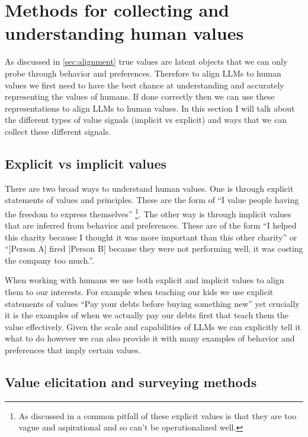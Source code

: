 \section{Methods for collecting and understanding human values}
\label{sec:values}

As discussed in \ref{sec:alignment} true values are latent objects that we can only probe through behavior and preferences. Therefore to align LLMs to human values we first need to have the best chance at understanding and accurately representing the values of humans. If done correctly then we can use these representations to align LLMs to human values. In this section I will talk about the different types of value signals (implicit vs explicit) and ways that we can collect these different signals.

\subsection{Explicit vs implicit values}

There are two broad ways to understand human values. One is through explicit statements of values and principles. These are the form of \enquote{I value people having the freedom to express themselves} \footnote{As discussed in \cite{klingefjordWhatAreHuman2024} a common pitfall of these explicit values is that they are too vague and aspirational and so can't be operationalized well.}. The other way is through implicit values that are inferred from behavior and preferences. These are of the form \enquote{I helped this charity because I thought it was more important than this other charity} or \enquote{[Person A] fired [Person B] because they were not performing well, it was costing the company too much.}.

When working with humans we use both explicit and implicit values to align them to our interests. For example when teaching our kids we use explicit statements of values \enquote{Pay your debts before buying something new} yet crucially it is the examples of when we actually pay our debts first that teach them the value effectively. Given the scale and capabilities of LLMs we can explicitly tell it what to do however we can also provide it with many examples of behavior and preferences that imply certain values.

\subsection{Value elicitation and surveying methods}

